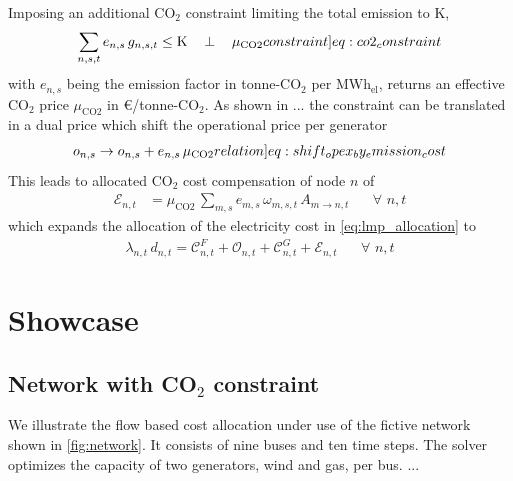 \documentclass[11pt]{article}
\newcommand{\generation}[1][n]{g_{#1,s,t}}
\newcommand{\generationshare}[1][n]{\omega_{#1,s,t}}
\newcommand{\capacityGeneration}{G_{n,s}}
\newcommand{\capexGeneration}{c_{n,s}}
\newcommand{\opexGeneration}[1][n]{o_{#1,s}}
\newcommand{\demandnodal}[1][n]{d_{#1,t}}
\newcommand{\lmp}[1][n]{\lambda_{#1,t}}
\newcommand{\allocatePeer}[1][m \rightarrow n]{A_{#1,t}}
\newcommand{\allocateCapexGeneration}[1][n]{\mathcal{C}^{G}_{#1,t}}
\newcommand{\allocateCapexFlow}[1][n]{\mathcal{C}^{F}_{#1,t}}
\newcommand{\allocateOpex}[1][n]{\mathcal{O}_{#1,t}}
\newcommand{\allocateEmissionCost}[1][n]{\mathcal{E}_{#1,t}}
\newcommand{\emission}[1][n]{e_{#1,s}}
\newcommand{\emissionPrice}{\mu_{\text{CO2}}}
\newcommand{\megawatthour}{MWh$_\text{el}$}
\newcommand{\resultsin}[1]{\hspace{12pt} \bot  \hspace{12pt} #1}
\newcommand{\Forall}[1]{\hspace{20pt} \forall \,\, #1 }
\begin{document}
Imposing an additional CO$_2$ constraint limiting the total emission to K,  
\begin{align}
 \sum_{n,s,t} \emission \, \generation \le \text{K} \resultsin{\emissionPrice} 
 \label[constraint]{eq:co2_constraint}
\end{align}
with $\emission$ being the emission factor in tonne-CO$_2$ per \megawatthour, returns an effective CO$_2$ price $\emissionPrice$ in \euro/tonne-CO$_2$. 
% 
As shown in ... the constraint can be translated in a dual price which shift the operational price per generator
\begin{align}
\opexGeneration \rightarrow \opexGeneration + \emission \, \emissionPrice \label[relation]{eq:shift_opex_by_emission_cost}
\end{align}
This leads to allocated CO$_2$ cost compensation of node $n$ of
 \begin{align}
 \allocateEmissionCost &= \emissionPrice \, \sum_{m,s} \emission[m] \, \generationshare[m] \, \allocatePeer \Forall{n,t} \label{eq:allocate_emissionPrice}
\end{align}
which expands the allocation of the electricity cost in \cref{eq:lmp_allocation} to 
\begin{align}
 \lmp \, \demandnodal = \allocateCapexFlow + \allocateOpex + \allocateCapexGeneration  + \allocateEmissionCost \Forall{n,t}
 \label{eq:lmp_allocation_with_emission}
\end{align}



\section*{Showcase}

\subsection*{Network with CO$_2$ constraint}
We illustrate the flow based cost allocation under use of the fictive network shown in \cref{fig:network}. It consists of nine buses and ten time steps. The solver optimizes the capacity of two generators, wind and gas, per bus. ...   
\end{document}
